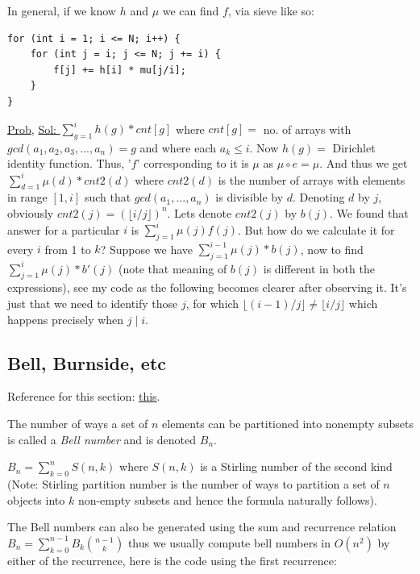 \documentclass[8pt, a4paper, oneside, twocolumn]{extarticle}
\begin{document}
In general, if we know $h$ and $\mu$ we can find $f$, via sieve like so:

\begin{verbatim}
for (int i = 1; i <= N; i++) { 
    for (int j = i; j <= N; j += i) {
        f[j] += h[i] * mu[j/i];
    } 
}
\end{verbatim}

\href{https://codeforces.com/contest/915/problem/G}{Prob}, \href{https://github.com/sourabhxyz/Competitive-Programming/blob/master/CF/ER36/G.cpp}{Sol: }$\sum_{g = 1}^{i}h(g)*cnt[g]$ where $cnt[g] = $ no. of arrays with $gcd(a_1, a_2, a_3, ..., a_n) = g$ and where each $a_k \leq i$. Now $h(g) = $ Dirichlet identity function. Thus, '$f$' corresponding to it is $\mu$ as $\mu \circ e = \mu$. And thus we get $\sum_{d = 1}^{i}\mu(d)*cnt2(d)$ where $cnt2(d)$ is the number of arrays with elements in range $[1, i]$ such that $gcd(a_1, \dots, a_n)$ is divisible by $d$. Denoting $d$ by $j$, obviously $cnt2(j) = (\lfloor i/j \rfloor)^n$. Lets denote $cnt2(j)$ by $b(j)$. We found that answer for a particular $i$ is $\sum_{j=1}^{i}\mu(j)f(j)$. But how do we calculate it for every $i$ from 1 to $k$? Suppose we have $\sum_{j = 1}^{i - 1}\mu(j)*b(j)$, now to find $\sum_{j = 1}^{i}\mu(j)*b'(j)$ (note that meaning of $b(j)$ is different in both the expressions), see my code as the following becomes clearer after observing it. It's just that we need to identify those $j$, for which $\lfloor (i - 1)/j \rfloor \ne \lfloor i/j \rfloor$ which happens precisely when $j \mid i$.

\subsection{Bell, Burnside, etc}

Reference for this section: \href{https://github.com/sourabhxyz/Competitive-Programming/blob/master/Reference%20Notes/cgt.pdf}{this}.

The number of ways a set of $n$ elements can be partitioned into nonempty subsets is called a \textit{Bell number} and is denoted $B_n$. 

$B_n=\sum_{k=0}^nS(n,k)$  where $S(n,k)$ is a Stirling number of the second kind (Note: Stirling partition number is the number of ways to partition a set of $n$ objects into $k$ non-empty subsets and hence the formula naturally follows).

The Bell numbers can also be generated using the sum and recurrence relation
$B_n=\sum_{k=0}^{n-1}B_k \binom{n - 1}{k}$ thus we usually compute bell numbers in $O(n^2)$ by either of the recurrence, here is the code using the first recurrence:
\end{document}
